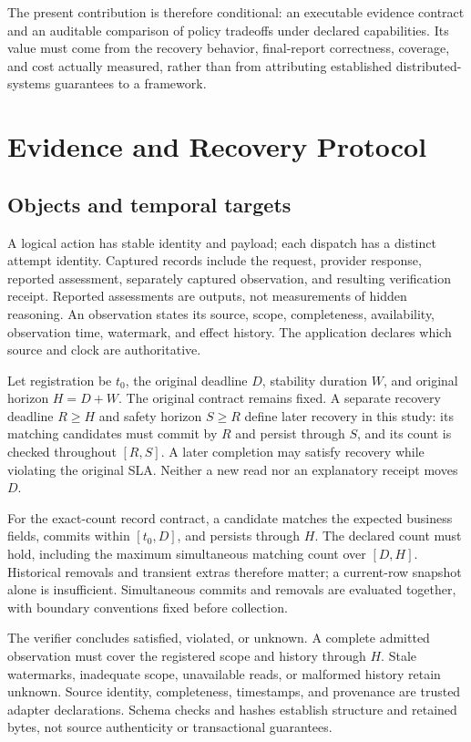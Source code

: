 \documentclass[conference]{IEEEtran}
\begin{document}
The present contribution is therefore conditional: an executable evidence contract and an auditable comparison of policy tradeoffs under declared capabilities. Its value must come from the recovery behavior, final-report correctness, coverage, and cost actually measured, rather than from attributing established distributed-systems guarantees to a framework.

\section{Evidence and Recovery Protocol}

\subsection{Objects and temporal targets}

A logical action has stable identity and payload; each dispatch has a distinct attempt identity. Captured records include the request, provider response, reported assessment, separately captured observation, and resulting verification receipt. Reported assessments are outputs, not measurements of hidden reasoning. An observation states its source, scope, completeness, availability, observation time, watermark, and effect history. The application declares which source and clock are authoritative.

Let registration be $t_0$, the original deadline $D$, stability duration $W$, and original horizon $H=D+W$. The original contract remains fixed. A separate recovery deadline $R\geq H$ and safety horizon $S\geq R$ define later recovery in this study: its matching candidates must commit by $R$ and persist through $S$, and its count is checked throughout $[R,S]$. A later completion may satisfy recovery while violating the original SLA. Neither a new read nor an explanatory receipt moves $D$.

For the exact-count record contract, a candidate matches the expected business fields, commits within $[t_0,D]$, and persists through $H$. The declared count must hold, including the maximum simultaneous matching count over $[D,H]$. Historical removals and transient extras therefore matter; a current-row snapshot alone is insufficient. Simultaneous commits and removals are evaluated together, with boundary conventions fixed before collection.

The verifier concludes satisfied, violated, or unknown. A complete admitted observation must cover the registered scope and history through $H$. Stale watermarks, inadequate scope, unavailable reads, or malformed history retain unknown. Source identity, completeness, timestamps, and provenance are trusted adapter declarations. Schema checks and hashes establish structure and retained bytes, not source authenticity or transactional guarantees.
\end{document}
